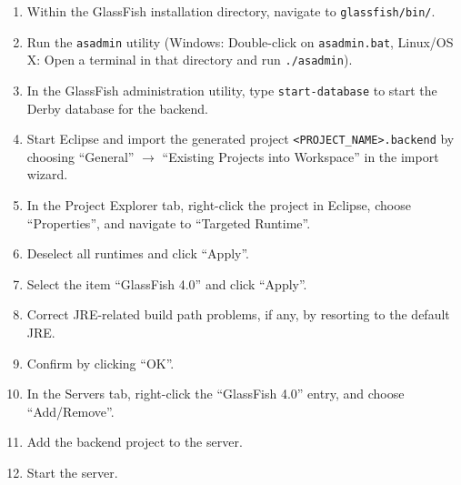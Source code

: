 \begin{enumerate}
\begin{enumerate}
\item Within the GlassFish installation directory, navigate to \lstinline[language=Simple]|glassfish/bin/|.
\item Run the \lstinline[language=Simple]|asadmin| utility (Windows: Double-click on \lstinline[language=Simple]|asadmin.bat|, Linux/OS X: Open a terminal in that directory and run \lstinline[language=Simple]|./asadmin|).
\item In the GlassFish administration utility, type \lstinline[language=Simple]|start-database| to start the Derby database for the backend.
\item Start Eclipse and import the generated project \lstinline[language=Simple]|<PROJECT_NAME>.backend| by choosing \enquote{General} $\rightarrow$ \enquote{Existing Projects into Workspace} in the import wizard.
\item In the Project Explorer tab, right-click the project in Eclipse, choose \enquote{Properties}, and navigate to \enquote{Targeted Runtime}.
\item Deselect all runtimes and click \enquote{Apply}.
\item Select the item \enquote{GlassFish 4.0} and click \enquote{Apply}.
\item Correct JRE-related build path problems, if any, by resorting to the default JRE.
\item Confirm by clicking \enquote{OK}.
\item In the Servers tab, right-click the \enquote{GlassFish 4.0} entry, and choose \enquote{Add/Remove}.
\item Add the backend project to the server.
\item Start the server.
\end{enumerate}


\end{enumerate}